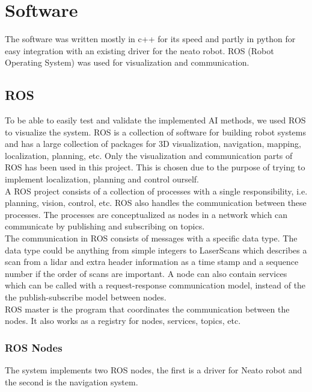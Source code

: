 
\section{Software} 
\label{sec:software}

The software was written mostly in c++ for its speed and partly in python for easy integration with an existing driver for the neato robot. ROS (Robot Operating System) was used for visualization and communication.

\subsection{ROS}
To be able to easily test and validate the implemented AI methods, we used ROS to visualize the system. ROS  is a collection of software for building robot systems and has a large collection of packages for 3D visualization, navigation, mapping, localization, planning, etc. Only the visualization and communication parts of ROS has been used in this project. This is chosen due to the purpose of trying to implement localization, planning and control ourself. \\

A ROS project consists of a collection of processes with a single responsibility, i.e. planning, vision, control, etc. ROS also handles the communication between these processes. The processes are conceptualized as nodes in a network which can communicate by publishing and subscribing on topics. \\

The communication in ROS consists of messages with a specific data type. The data type could be anything from simple integers to LaserScans which describes a scan from a lidar and extra header information as a time stamp and a sequence number if the order of scans are important. A node can also contain services which can be called with a request-response communication model, instead of the the publish-subscribe model between nodes.\\

ROS master is the program that coordinates the communication between the nodes. It also works as a registry for nodes, services, topics, etc.

\subsubsection{ROS Nodes}
The system implements two ROS nodes, the first is a driver for Neato robot and the second is the navigation system.\\

